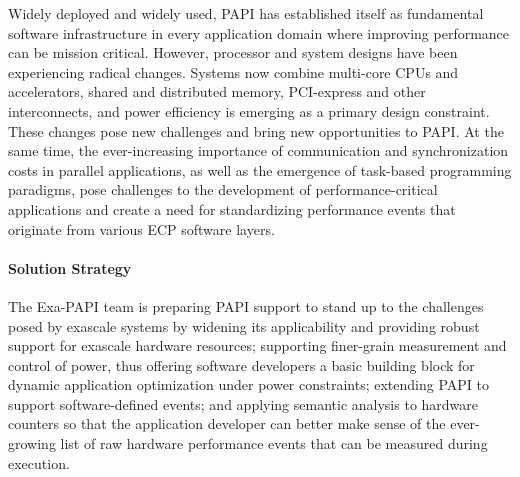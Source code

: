 Widely deployed and widely used, PAPI has established itself as fundamental
software infrastructure in every application domain where improving performance
can be mission critical. 
However, processor and system designs have been experiencing radical changes.
Systems now combine multi-core CPUs and accelerators, shared and
distributed memory, PCI-express and other interconnects, and
power efficiency is emerging as a primary design constraint.
These changes pose new challenges and bring new
opportunities to PAPI. At the same time, the ever-increasing importance of
communication and synchronization costs in parallel applications, as well as the
emergence of task-based programming paradigms, pose
challenges to the development of performance-critical applications and create a
need for standardizing performance events that originate from various ECP
software layers.


\paragraph{Solution Strategy}

The Exa-PAPI team is preparing PAPI support to stand up to 
the challenges posed by exascale systems by 
widening its applicability and providing robust support for exascale 
hardware resources;
supporting finer-grain measurement and control of power, thus offering 
software developers a basic building block for dynamic application optimization 
under power constraints; 
extending PAPI to support software-defined events; and 
applying semantic analysis to hardware counters so that the application 
developer can better make sense of the ever-growing list of raw hardware 
performance events that can be measured during execution. 

